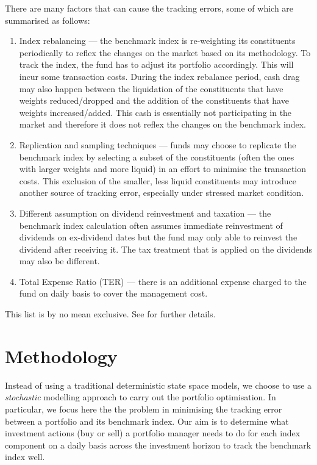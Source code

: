 There are many factors that can cause the tracking errors, some of which are summarised as follows:
\begin{enumerate}
\item Index rebalancing --- the benchmark index is re-weighting its constituents periodically to reflex the changes on the market based on its methodology. To track the index, the fund has to adjust its portfolio accordingly. This will incur some transaction costs. During the index rebalance period, cash drag may also  happen between the liquidation of the constituents that have weights reduced/dropped and the addition of the constituents that have weights increased/added. This cash is essentially not participating in the market and therefore it does not reflex the changes on the benchmark index.
\item Replication and sampling techniques --- funds may choose to replicate the benchmark index by selecting a subset of the constituents (often the ones with larger weights and more liquid) in an effort to minimise the transaction costs. This exclusion of the smaller, less liquid constituents may introduce another source of tracking error, especially under stressed market condition.
\item Different assumption on dividend reinvestment and taxation --- the benchmark index calculation often assumes immediate reinvestment of dividends on ex-dividend dates but the fund may only able to reinvest the dividend after receiving it. The tax treatment that is applied on the dividends may also be different.
\item Total Expense Ratio (TER) --- there is an additional expense charged to the fund on daily basis to cover the management cost.
\end{enumerate}
This list is by no mean exclusive. See \cite{BJ13} for further details.
 
\section{Methodology}
Instead of using a traditional deterministic state space models, we choose to use a \emph{stochastic} modelling approach to carry out the portfolio optimisation. In particular, we focus here the the problem in minimising the tracking error between a portfolio and its benchmark index.  Our aim is to determine what investment actions (buy or sell) a portfolio manager needs to do for each index component on a daily basis across the investment horizon to track the benchmark index well.

